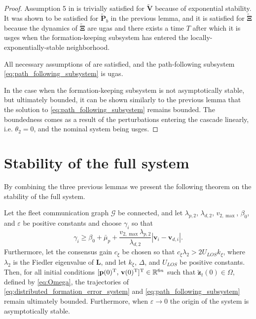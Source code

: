 \begin{proof}
    Assumption 5 in \cite[Theorem 2.1]{lamnabhi-lagarrigue_2_2005} is trivially satisfied for $\widetilde{\mathbf{V}}$ because of exponential stability. It was shown to be satisfied for $\widetilde{\mathbf{P}}_b$ in the previous lemma, and it is satisfied for $\widetilde{\bm{\Xi}}$ because the dynamics of $\widetilde{\bm{\Xi}}$ are \gls{ugas} and there exists a time $T$ after which it is \gls{usges} when the formation-keeping subsystem has entered the locally-exponentially-stable neighborhood.

    All necessary assumptions of \cite[Theorem 2.1]{lamnabhi-lagarrigue_2_2005} are satisfied, and the path-following subsystem \eqref{eq:path_following_subsystem} is \gls{ugas}.

    In the case when the formation-keeping subsystem is not asymptotically stable, but ultimately bounded, it can be shown similarly to the previous lemma that the solution to \eqref{eq:path_following_subsystem} remains bounded. The boundedness comes as a result of the perturbations entering the cascade linearly, i.e. $\theta_2 = 0$, and the nominal system being \gls{usges}.
\end{proof}

\section{Stability of the full system}
By combining the three previous lemmas we present the following theorem on the stability of the full system.

\begin{theorem}
Let the fleet communication graph $\mathcal{G}$ be connected, and let $\lambda_{p,2}$, $\lambda_{d,2}$, $v_{2,\max}$, $\beta_0$, and $\varepsilon$ be positive constants and choose $\gamma_i$ so that  
\begin{equation}
    \gamma_i \geq \beta_0 + \bar{\mu}_p + \frac{v_{2,\max} \lambda_{p,2}}{\lambda_{d,2}}|\mathbf{v}_i - \mathbf{v}_{d,i}|.
\end{equation}  
    Furthermore, let the consensus gain $c_\xi$ be chosen so that $c_\xi \lambda_2 > 2 U_{LOS} k_\xi$, where $\lambda_2$ is the Fiedler eigenvalue of $\mathbf{L}$, and let $k_\xi$, $\Delta$, and $U_{LOS}$ be positive constants.
    Then, for all initial conditions $[\mathbf{p}(0)^{\rm T} ,\, \mathbf{v}(0)^{\rm T}]^{\rm T} \in \mathbb{R}^{6n}$ such that $\tilde{\mathbf{z}}_{t}(0) \in \Omega$, defined by \eqref{eq:Omega}, the trajectories of \eqref{eq:distributed_formation_error_system} and \eqref{eq:path_following_subsystem} remain ultimately bounded. Furthermore, when $\varepsilon\rightarrow0$ the origin of the system is asymptotically stable.
\end{theorem}
